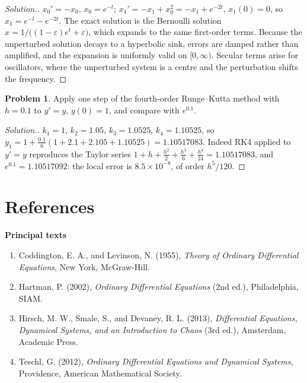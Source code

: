 \documentclass[11pt,a4paper]{article}
\numberwithin{equation}{section}
\theoremstyle{definition}
\newtheorem{problemx}{Problem}[subsection]
\newenvironment{problem}{\begin{problemx}}{\end{problemx}}
\newenvironment{solution}
  {\renewcommand{\qedsymbol}{}\begin{proof}[\textit{Solution}.]}
  {\end{proof}}
\newcommand{\subhead}[1]{%
  \par\medskip\noindent\textbf{#1}\par\nobreak\smallskip}
\begin{document}
\begin{solution}
$x_0' = -x_0$, $x_0 = e^{-t}$; $x_1' = -x_1 + x_0^2 = -x_1 + e^{-2t}$, $x_1(0) = 0$, so $x_1 = e^{-t} - e^{-2t}$. The exact solution is the Bernoulli solution $x = 1/\bigl((1 - \varepsilon)e^t + \varepsilon\bigr)$, which expands to the same
first-order terms. Because the unperturbed solution decays to a hyperbolic sink, errors are damped rather than amplified, and the expansion is uniformly valid on $[0, \infty)$. Secular terms arise
for oscillators, where the unperturbed system is a centre and the perturbation shifts the frequency.
\end{solution}

\begin{problem}
Apply one step of the fourth-order Runge--Kutta method with $h = 0.1$ to $y' = y$, $y(0) = 1$, and compare with $e^{0.1}$.
\end{problem}

\begin{solution}
$k_1 = 1$, $k_2 = 1.05$, $k_3 = 1.0525$, $k_4 = 1.10525$, so $y_1 = 1 + \frac{0.1}{6}(1 + 2.1 + 2.105 + 1.10525) = 1.1051708\overline{3}$. Indeed RK4 applied to $y' = y$ reproduces the Taylor series $1 + h + \frac{h^2}2 + \frac{h^3}6 + \frac{h^4}{24} = 1.10517083$,
and $e^{0.1} = 1.10517092$: the local error is $8.5 \times 10^{-8}$, of order $h^5/120$.
\end{solution}

\section*{References}

\subhead{Principal texts}
\begin{enumerate}
\item Coddington, E. A., and Levinson, N. (1955), \emph{Theory of Ordinary Differential Equations}, New York, McGraw-Hill.
\item Hartman, P. (2002), \emph{Ordinary Differential Equations} (2nd ed.), Philadelphia, SIAM.
\item Hirsch, M. W., Smale, S., and Devaney, R. L. (2013), \emph{Differential Equations, Dynamical Systems, and an Introduction to Chaos} (3rd ed.),
Amsterdam, Academic Press.
\item Teschl, G. (2012), \emph{Ordinary Differential Equations and Dynamical Systems}, Providence, American Mathematical Society.
\end{enumerate}
\end{document}
